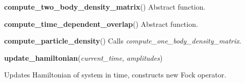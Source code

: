 \begin{tcolorbox}
{    \hspace{2em} \textbf{compute\_two\_body\_density\_matrix}() Abstract function.
    
    \hspace{2em} \textbf{compute\_time\_dependent\_overlap}() Abstract function.

    \hspace{2em} \textbf{compute\_particle\_density}()
        Calls \emph{compute\_one\_body\_density\_matrix}.

    \hspace{2em} \textbf{update\_hamiltonian}(\emph{current\_time}, \emph{amplitudes})
        \begin{adjustwidth}{4em}{}
        Updates Hamiltonian of system in time, constructs new Fock operator.
        \end{adjustwidth}
   
    } 
\end{tcolorbox}